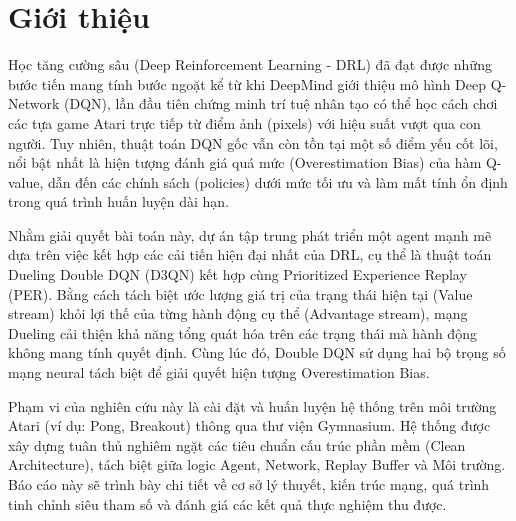 \section{Giới thiệu}

Học tăng cường sâu (Deep Reinforcement Learning - DRL) đã đạt được những bước tiến mang tính bước ngoặt kể từ khi DeepMind giới thiệu mô hình Deep Q-Network (DQN), lần đầu tiên chứng minh trí tuệ nhân tạo có thể học cách chơi các tựa game Atari trực tiếp từ điểm ảnh (pixels) với hiệu suất vượt qua con người. Tuy nhiên, thuật toán DQN gốc vẫn còn tồn tại một số điểm yếu cốt lõi, nổi bật nhất là hiện tượng đánh giá quá mức (Overestimation Bias) của hàm Q-value, dẫn đến các chính sách (policies) dưới mức tối ưu và làm mất tính ổn định trong quá trình huấn luyện dài hạn.

Nhằm giải quyết bài toán này, dự án tập trung phát triển một agent mạnh mẽ dựa trên việc kết hợp các cải tiến hiện đại nhất của DRL, cụ thể là thuật toán Dueling Double DQN (D3QN) kết hợp cùng Prioritized Experience Replay (PER). Bằng cách tách biệt ước lượng giá trị của trạng thái hiện tại (Value stream) khỏi lợi thế của từng hành động cụ thể (Advantage stream), mạng Dueling cải thiện khả năng tổng quát hóa trên các trạng thái mà hành động không mang tính quyết định. Cùng lúc đó, Double DQN sử dụng hai bộ trọng số mạng neural tách biệt để giải quyết hiện tượng Overestimation Bias.

Phạm vi của nghiên cứu này là cài đặt và huấn luyện hệ thống trên môi trường Atari (ví dụ: Pong, Breakout) thông qua thư viện Gymnasium. Hệ thống được xây dựng tuân thủ nghiêm ngặt các tiêu chuẩn cấu trúc phần mềm (Clean Architecture), tách biệt giữa logic Agent, Network, Replay Buffer và Môi trường. Báo cáo này sẽ trình bày chi tiết về cơ sở lý thuyết, kiến trúc mạng, quá trình tinh chỉnh siêu tham số và đánh giá các kết quả thực nghiệm thu được.
